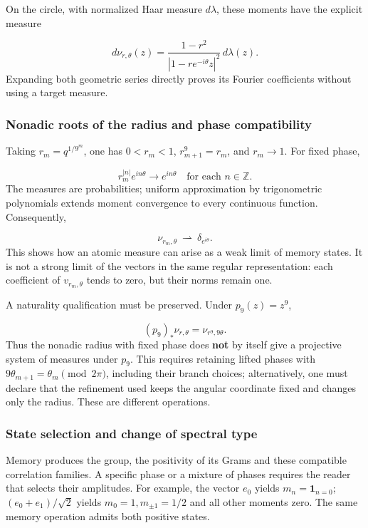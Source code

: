 On the circle, with normalized Haar measure \(d\lambda\), these moments have the explicit measure

\[
d\nu_{r,\theta}(z)
=\frac{1-r^2}{|1-r e^{-i\theta}z|^2}\,d\lambda(z).
\]
Expanding both geometric series directly proves its Fourier coefficients without using a target measure.


\subsubsection{Nonadic roots of the radius and phase compatibility}
\label{viii:tm-add-m3-1}
Taking \(r_m=q^{1/9^m}\), one has \(0<r_m<1\), \(r_{m+1}^{9}=r_m\), and \(r_m\to1\). For fixed phase,

\[
r_m^{|n|}e^{in\theta}\longrightarrow e^{in\theta}
\quad\text{for each }n\in\mathbb Z.
\]
The measures are probabilities; uniform approximation by trigonometric polynomials extends moment convergence to every continuous function. Consequently,

\[
\nu_{r_m,\theta}\ \rightharpoonup\ \delta_{e^{i\theta}}.
\]
This shows how an atomic measure can arise as a weak limit of memory states. It is not a strong limit of the vectors in the same regular representation: each coefficient of \(v_{r_m,\theta}\) tends to zero, but their norms remain one.

A naturality qualification must be preserved. Under \(p_9(z)=z^9\),

\[
(p_9)_*\nu_{r,\theta}=\nu_{r^9,9\theta}.
\]
Thus the nonadic radius with fixed phase does \textbf{not} by itself give a projective system of measures under \(p_9\). This requires retaining lifted phases with \(9\theta_{m+1}=\theta_m\pmod{2\pi}\), including their branch choices; alternatively, one must declare that the refinement used keeps the angular coordinate fixed and changes only the radius. These are different operations.


\subsubsection{State selection and change of spectral type}
\label{viii:tm-add-m3-2}
Memory produces the group, the positivity of its Grams and these compatible correlation families. A specific phase or a mixture of phases requires the reader that selects their amplitudes. For example, the vector \(e_0\) yields \(m_n=\mathbf1_{n=0}\); \((e_0+e_1)/\sqrt2\) yields \(m_0=1,m_{\pm1}=1/2\) and all other moments zero. The same memory operation admits both positive states.

